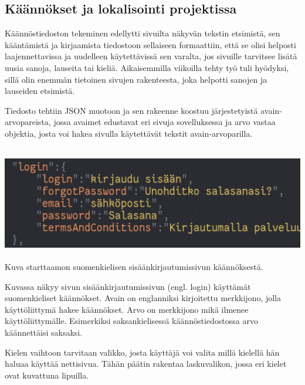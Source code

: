 \subsection*{Käännökset ja lokalisointi projektissa}

Käännöstiedoston tekeminen edellytti sivuilta näkyvän tekstin etsimistä, sen kääntämistä ja kirjaamista tiedostoon sellaiseen formaattiin, että se olisi helposti laajennettavissa ja uudelleen käytettävissä sen varalta, jos sivuille tarvitsee lisätä uusia sanoja, lauseita tai kieliä.
Aikaisemmilla viikoilla tehty työ tuli hyödyksi, sillä olin enemmän tietoinen sivujen rakenteesta, joka helpotti sanojen ja lauseiden etsimistä.\medskip

Tiedosto tehtiin JSON muotoon ja sen rakeenne koostuu järjestetyistä avain-arvopareista, jossa avaimet edustavat eri sivuja sovelluksessa ja
arvo vastaa objektia, josta voi hakea sivulla käytettävät tekstit avain-arvoparilla.



\medskip
\includegraphics[width= 15cm, height=5cm]{src/public/jsonfixed.png} \\
\medskip
Kuva starttaamon suomenkielisen sisäänkirjautumissivun käännöksestä.
\medskip

Kuvassa näkyy sivun sisäänkirjautumissivun (engl. login) käyttämät suomenkieliset käännökset. Avain on englanniksi kirjoitettu merkkijono, jolla käyttöliittymä hakee käännökset. Arvo on merkkijono mikä ilmenee käyttöliittymälle.
Esimerkiksi saksankielisessä käännöstiedostossa arvo käännettäisi saksaksi.

\medskip

Kielen vaihtoon tarvitaan valikko, josta käyttäjä voi valita millä kielellä hän haluaa käyttää nettisivua. 
Tähän päätin rakentaa laskuvalikon, jossa eri kielet ovat kuvattuna lipuilla.
\medskip





